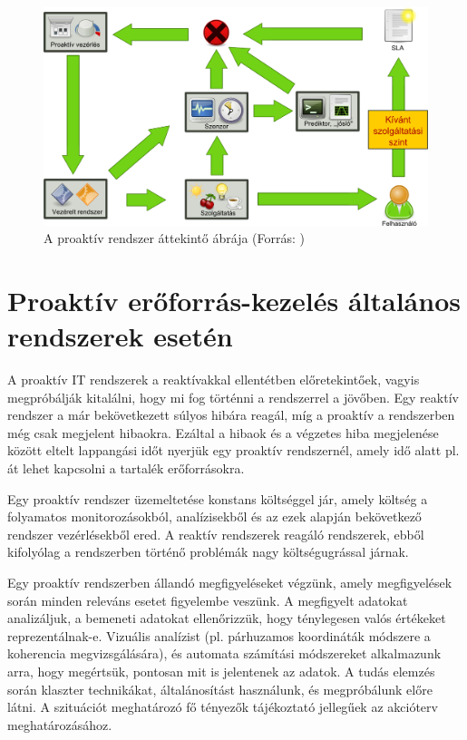 \begin{figure}[h!]
\centering
\includegraphics[width=1.00\textwidth]{figures/proactive_system.png}
\caption{A proaktív rendszer áttekintő ábrája (Forrás: \cite{patariczapro}) \label{fig:proactive_system}}
\end{figure}

\section{Proaktív erőforrás-kezelés általános rendszerek esetén}

A proaktív IT rendszerek a reaktívakkal ellentétben előretekintőek, vagyis megpróbálják kitalálni, hogy mi fog történni a rendszerrel a jövőben. Egy reaktív rendszer a már bekövetkezett súlyos hibára reagál, míg a proaktív a rendszerben még csak megjelent hibaokra. Ezáltal a hibaok és a végzetes hiba megjelenése között eltelt lappangási időt nyerjük egy proaktív rendszernél, amely idő alatt pl. át lehet kapcsolni a tartalék erőforrásokra.

Egy proaktív rendszer üzemeltetése konstans költséggel jár, amely költség a folyamatos monitorozásokból, analízisekből és az ezek alapján bekövetkező rendszer vezérlésekből ered. A reaktív rendszerek reagáló rendszerek, ebből kifolyólag a rendszerben történő problémák nagy költségugrással járnak.

Egy proaktív rendszerben állandó megfigyeléseket végzünk, amely megfigyelések során minden releváns esetet figyelembe veszünk. A megfigyelt adatokat analizáljuk, a bemeneti adatokat ellenőrizzük, hogy ténylegesen valós értékeket reprezentálnak-e. Vizuális analízist (pl. párhuzamos koordináták módszere a koherencia megvizsgálására), és automata számítási módszereket alkalmazunk arra, hogy megértsük, pontosan mit is jelentenek az adatok. A tudás elemzés során klaszter technikákat, általánosítást használunk, és megpróbálunk előre látni. A szituációt meghatározó fő tényezők tájékoztató jellegűek az akcióterv meghatározásához.

